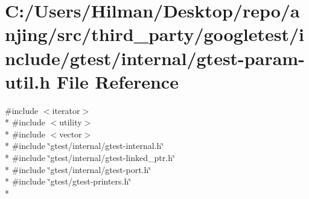 \hypertarget{gtest-param-util_8h}{}\section{C\+:/\+Users/\+Hilman/\+Desktop/repo/anjing/src/third\+\_\+party/googletest/include/gtest/internal/gtest-\/param-\/util.h File Reference}
\label{gtest-param-util_8h}
{\ttfamily \#include $<$iterator$>$}\\*
{\ttfamily \#include $<$utility$>$}\\*
{\ttfamily \#include $<$vector$>$}\\*
{\ttfamily \#include \char`\"{}gtest/internal/gtest-\/internal.\+h\char`\"{}}\\*
{\ttfamily \#include \char`\"{}gtest/internal/gtest-\/linked\+\_\+ptr.\+h\char`\"{}}\\*
{\ttfamily \#include \char`\"{}gtest/internal/gtest-\/port.\+h\char`\"{}}\\*
{\ttfamily \#include \char`\"{}gtest/gtest-\/printers.\+h\char`\"{}}\\*
